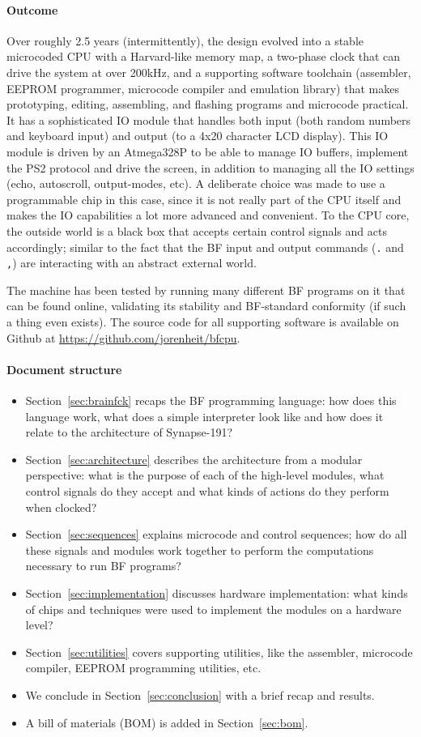 \paragraph{Outcome}
Over roughly 2.5 years (intermittently), the design evolved into a stable microcoded CPU with a Harvard-like memory map, a two-phase clock that can drive the system at over 200kHz, and a supporting software toolchain (assembler, EEPROM programmer, microcode compiler and emulation library) that makes prototyping, editing, assembling, and flashing programs and microcode practical. It has a sophisticated IO module that handles both input (both random numbers and keyboard input) and output (to a 4x20 character LCD display). This IO module is driven by an Atmega328P to be able to manage IO buffers, implement the PS2 protocol and drive the screen, in addition to managing all the IO settings (echo, autoscroll, output-modes, etc). A deliberate choice was made to use a programmable chip in this case, since it is not really part of the CPU itself and makes the IO capabilities a lot more advanced and convenient. To the CPU core, the outside world is a black box that accepts certain control signals and acts accordingly; similar to the fact that the BF input and output commands (\texttt{.} and \texttt{,}) are interacting with an abstract external world.

The machine has been tested by running many different BF programs on it that can be found online, validating its stability and BF-standard conformity (if such a thing even exists). The source code for all supporting software is available on Github at \url{https://github.com/jorenheit/bfcpu}.

\paragraph{Document structure}
\begin{itemize}
  \item Section~\ref{sec:brainfck} recaps the BF programming language: how does this language work, what does a simple interpreter look like and how does it relate to the architecture of Synapse-191?
  \item Section~\ref{sec:architecture} describes the architecture from a modular perspective: what is the purpose of each of the high-level modules, what control signals do they accept and what kinds of actions do they perform when clocked?
  \item Section~\ref{sec:sequences} explains microcode and control sequences; how do all these signals and modules work together to perform the computations necessary to run BF programs?
  \item Section~\ref{sec:implementation} discusses hardware implementation: what kinds of chips and techniques were used to implement the modules on a hardware level?
  \item Section~\ref{sec:utilities} covers supporting utilities, like the assembler, microcode compiler, EEPROM programming utilities, etc. 
  \item We conclude in Section~\ref{sec:conclusion} with a brief recap and results.
  \item A bill of materials (BOM) is added in Section~\ref{sec:bom}.
\end{itemize}
